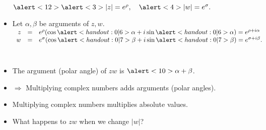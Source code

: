 \begin{frame}
\begin{columns}
\begin{itemize}
{\hfil $\alert<12>{ \alert<3>{ |z| =e^\rho},\quad \alert<4>{ |w|=e^\sigma}}.$
}
\item<5-> Let $\alpha,\beta$ be arguments of $z,w$. 
$
\begin{array}{rcl}
z&=& e^{\rho}(\cos \alert<handout:0|6>{\alpha} + i \sin \alert<handout:0|6>{\alpha} )=e^{\rho +i\alpha} \\
w&=& e^{\sigma}(\cos \alert<handout:0|7>{\beta} +i\sin \alert<handout:0|7>{\beta} )=e^{\sigma +i\beta} .\end{array} 
$
\end{itemize}
\end{columns}
%
\begin{itemize}
\item<10-> The argument (polar angle) of $zw$ is $\alert<10>{\alpha+\beta} $.
\item<11-> $\Rightarrow$ Multiplying complex numbers adds arguments (polar angles).
\item<12-> Multiplying complex numbers multiplies absolute values.
\item<13-> \alert<13-17>{What happens to $zw$ when we change $|w|$?} 
\end{itemize}
\end{frame}